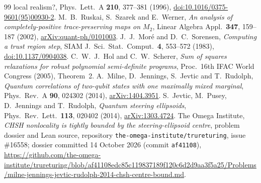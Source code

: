 \documentclass[11pt,a4paper]{article}
\theoremstyle{remark}\newtheorem{remark}[theorem]{Remark}
\begin{document}
\begin{thebibliography}{99}
{local realism?}, Phys.\ Lett.\ A \textbf{210}, 377--381 (1996),
\href{https://doi.org/10.1016/0375-9601(95)00930-2}{doi:10.1016/0375-9601(95)00930-2}.
 M.~B.~Ruskai, S.~Szarek and E.~Werner,
\emph{An analysis of completely-positive trace-preserving maps on $M_2$},
Linear Algebra Appl.\ \textbf{347}, 159--187 (2002),
\href{https://arxiv.org/abs/quant-ph/0101003}{arXiv:quant-ph/0101003}.
 J.~J.~Mor\'e and D.~C.~Sorensen,
\emph{Computing a trust region step}, SIAM J.\ Sci.\ Stat.\ Comput.\
\textbf{4}, 553--572 (1983),
\href{https://doi.org/10.1137/0904038}{doi:10.1137/0904038}.
 C.~W.~J.~Hol and C.~W.~Scherer,
\emph{Sum of squares relaxations for robust polynomial semi-definite
programs}, Proc.\ 16th IFAC World Congress (2005), Theorem~2.
 A.~Milne, D.~Jennings, S.~Jevtic and T.~Rudolph,
\emph{Quantum correlations of two-qubit states with one maximally mixed
marginal}, Phys.\ Rev.\ A \textbf{90}, 024302 (2014),
\href{https://arxiv.org/abs/1404.3951}{arXiv:1404.3951}.
 S.~Jevtic, M.~Pusey, D.~Jennings and T.~Rudolph,
\emph{Quantum steering ellipsoids}, Phys.\ Rev.\ Lett.\ \textbf{113},
020402 (2014), \href{https://arxiv.org/abs/1303.4724}{arXiv:1303.4724}.
\bibitem{dossier} The Omega Institute, \emph{CHSH nonlocality is tightly
bounded by the steering-ellipsoid centre}, problem dossier and Lean source,
repository \texttt{the-omega-institute/trureturing}, issue \#16558; dossier
committed 14 October 2026 (commit \texttt{af41108}),
\url{https://github.com/the-omega-institute/trureturing/blob/af41108edc85c119837189f120c6d2d9aa3f5a25/Problems/milne-jennings-jevtic-rudolph-2014-chsh-centre-bound.md}.
\end{thebibliography}
\end{document}
